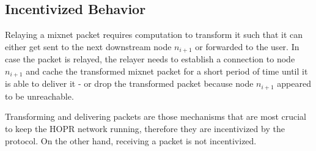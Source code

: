 \subsection{Incentivized Behavior}
\label{sec:incentives:behavior}

Relaying a mixnet packet requires computation to transform it such that it can either get sent to the next downstream node $n_{i+1}$ or forwarded to the user. In case the packet is relayed, the relayer needs to establish a connection to node $n_{i+1}$ and cache the transformed mixnet packet for a short period of time until it is able to deliver it - or drop the transformed packet because node $n_{i+1}$ appeared to be unreachable.

Transforming and delivering packets are those mechanisms that are most crucial to keep the HOPR network running, therefore they are incentivized by the protocol. On the other hand, receiving a packet is not incentivized.
